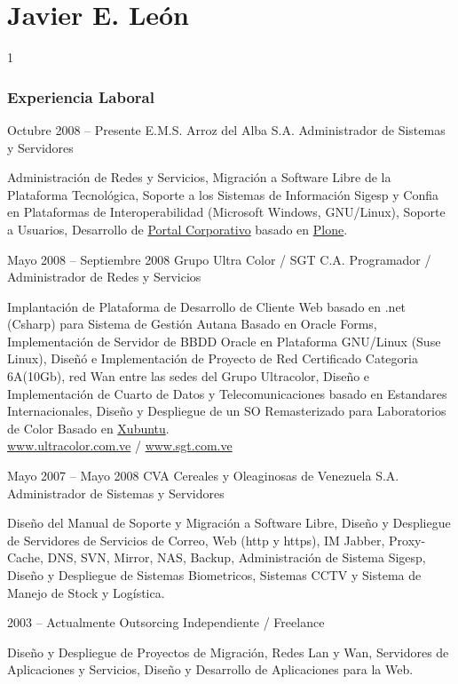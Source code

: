 \documentclass{tccv}
\begin{document}
\part{Javier E. Le\'on}
     {1}
 
\section{Experiencia Laboral}

\begin{experiencia}

\item{Octubre 2008 -- Presente}
     {E.M.S. Arroz del Alba S.A.}
     {Administrador de Sistemas y Servidores}

Administraci\'on de Redes y Servicios, Migraci\'on a Software Libre de la Plataforma Tecnol\'ogica, Soporte a los Sistemas de Informaci\'on Sigesp y Confia en Plataformas de Interoperabilidad (Microsoft Windows, GNU/Linux), Soporte a Usuarios, Desarrollo de \href{http://www.arrozdelalba.gob.ve/}{Portal Corporativo} basado en \href{http://www.plone.org/}{Plone}.

\item{Mayo 2008 -- Septiembre 2008}
     {Grupo Ultra Color / SGT C.A.}
     {Programador / Administrador de Redes y Servicios}

Implantaci\'on de Plataforma de Desarrollo de Cliente Web basado en .net (Csharp) para Sistema de Gesti\'on Autana Basado en Oracle Forms, Implementaci\'on de Servidor de BBDD Oracle en Plataforma GNU/Linux (Suse Linux), Dise\~n\'o e Implementaci\'on de Proyecto de Red Certificado Categoria 6A(10Gb), red Wan entre las sedes del Grupo Ultracolor, Dise\~no e Implementaci\'on de Cuarto de Datos y Telecomunicaciones basado en Estandares Internacionales, Dise\~no y Despliegue de un SO Remasterizado para Laboratorios de Color Basado en \href{http://www.xubuntu.com/}{Xubuntu}.\\
\href{http://www.ultracolor.com.ve}{www.ultracolor.com.ve} / \href{http://www.sgt.com.ve/}{www.sgt.com.ve} 

\item{Mayo 2007 -- Mayo 2008}
     {CVA Cereales y Oleaginosas de Venezuela S.A.}
     {Administrador de Sistemas y Servidores}

Dise\~no del Manual de Soporte y Migraci\'on a Software Libre, Dise\~no y Despliegue de Servidores de Servicios de Correo, Web (http y https), IM Jabber, Proxy-Cache, DNS, SVN, Mirror, NAS, Backup, Administraci\'on de Sistema Sigesp, Dise\~no y Despliegue de Sistemas Biometricos, Sistemas CCTV y Sistema de Manejo de Stock y Log\'istica.

\item{2003 -- Actualmente}
     {Outsorcing}
     {Independiente / Freelance}

Dise\~no y Despliegue de Proyectos de Migraci\'on, Redes Lan y Wan, Servidores de Aplicaciones y Servicios, Dise\~no y Desarrollo de Aplicaciones para la Web.

\end{experiencia}
\end{document}
